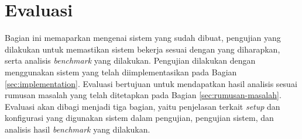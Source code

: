 \section{Evaluasi}
\label{sec:evaluasi}

Bagian ini memaparkan mengenai sistem yang sudah dibuat, pengujian yang dilakukan untuk memastikan sistem bekerja sesuai dengan yang diharapkan, serta analisis \textit{benchmark} yang dilakukan. Pengujian dilakukan dengan menggunakan sistem yang telah diimplementasikan pada Bagian \ref{sec:implementation}. Evaluasi bertujuan untuk mendapatkan hasil analisis sesuai rumusan masalah yang telah ditetapkan pada Bagian \ref{sec:rumusan-masalah}. Evaluasi akan dibagi menjadi tiga bagian, yaitu penjelasan terkait \textit{setup} dan konfigurasi yang digunakan sistem dalam pengujian, pengujian sistem, dan analisis hasil \textit{benchmark} yang dilakukan.



